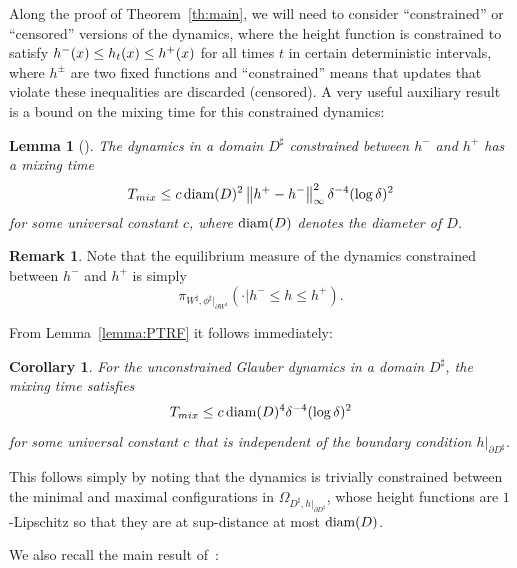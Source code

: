 \documentclass[10pt]{amsart}
\newtheorem{lemm}[theo]{Lemma}\newtheorem{prop}[theo]{Proposition}\newtheorem{coro}[theo]{Corollary}\newtheorem{conj}[theo]{Conjecture}
\theoremstyle{definition}\newtheorem{defi}[theo]{Definition}\newtheorem{rema}[theo]{Remark}\newtheorem{exam}[theo]{Example}\newtheorem{exem}[theo]{Example}\newtheorem{nota}[theo]{Notation}
\renewcommand{\d}{{\sharp }}
\begin{document}
Along the proof of Theorem~\ref{th:main}, we will need to consider ``constrained'' or ``censored'' versions of the dynamics, where the height function is constrained to satisfy $h^-(x)\linebreak\le h_t(x)\le h^+(x)$ for all times $t$ in certain deterministic intervals, where $h^\pm$ are two fixed functions and ``constrained'' means that updates that violate these inequalities are discarded (censored). A very useful auxiliary result is a bound on the mixing time for this constrained dynamics:

\begin{lemm}[{\cite[Th.~4.3]{CMT}\label{lemma:PTRF}}]
The dynamics in a domain $D^\d$ constrained between $h^-$ and $h^+$ has a mixing time
\begin{equation}
T_{mix}\le c\, {\rm diam}(D)^2\left\|h^+-h^-\right\|_\infty^2\delta^{-4}(\log\delta)^2
\end{equation}
for some universal constant $c$, where ${\rm diam}(D)$ denotes the diameter of $D$.
\end{lemm}


\begin{rema}
Note that the equilibrium measure of the dynamics constrained between $h^-$ and $h^+$ is simply
\begin{equation}\label{rem:eqmes}
\pi_{W^\d,\phi^\d|_{\partial W^\d}}\left(\cdot|h^-\le h\le h^+\right).
\end{equation}
\end{rema}

From Lemma~\ref{lemma:PTRF} it follows immediately:

\begin{coro}\label{cor:L4}
For the unconstrained Glauber dynamics in a domain $D^\d$, the mixing time satisfies
\begin{equation}
T_{mix}\le c\, {\rm diam}(D)^4\delta^{-4}(\log\delta)^2
\end{equation}
for some universal constant $c$ that is independent of the boundary condition $h|_{\partial D^\d}$.
\end{coro}

This follows simply by noting that the dynamics is trivially constrained between the minimal and maximal configurations in $\Omega_{D^\d,h|_{\partial D^\d}}$, whose height functions are $1$-Lipschitz so that they are at sup-distance at most ${\rm diam}(D)$.



We also recall the main result of~\cite{LT_cmp}:
\end{document}

